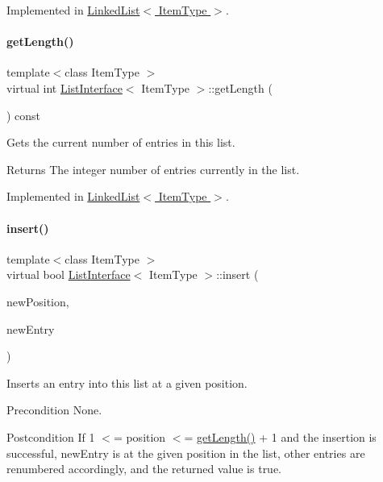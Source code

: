 Implemented in \hyperlink{class_linked_list_a341bfd7772c9d24d29eb7a7f3936915b}{Linked\+List$<$ Item\+Type $>$}.

\hypertarget{class_list_interface_afc85695d4137f1e29ff02e179c9f3221}{}\label{class_list_interface_afc85695d4137f1e29ff02e179c9f3221} 
\paragraph{\texorpdfstring{get\+Length()}{getLength()}}
{\footnotesize\ttfamily template$<$class Item\+Type $>$ \\
virtual int \hyperlink{class_list_interface}{List\+Interface}$<$ Item\+Type $>$\+::get\+Length (\begin{DoxyParamCaption}{ }\end{DoxyParamCaption}) const\hspace{0.3cm}{\ttfamily [pure virtual]}}

Gets the current number of entries in this list. \begin{DoxyReturn}{Returns}
The integer number of entries currently in the list. 
\end{DoxyReturn}


Implemented in \hyperlink{class_linked_list_a61d045ef6008b494a1a516ecc992c0e7}{Linked\+List$<$ Item\+Type $>$}.

\hypertarget{class_list_interface_a5b2f86954a86172699a3495982c38e77}{}\label{class_list_interface_a5b2f86954a86172699a3495982c38e77} 
\paragraph{\texorpdfstring{insert()}{insert()}}
{\footnotesize\ttfamily template$<$class Item\+Type $>$ \\
virtual bool \hyperlink{class_list_interface}{List\+Interface}$<$ Item\+Type $>$\+::insert (\begin{DoxyParamCaption}\item[{int}]{new\+Position,  }\item[{const Item\+Type \&}]{new\+Entry }\end{DoxyParamCaption})\hspace{0.3cm}{\ttfamily [pure virtual]}}

Inserts an entry into this list at a given position. \begin{DoxyPrecond}{Precondition}
None. 
\end{DoxyPrecond}
\begin{DoxyPostcond}{Postcondition}
If 1 $<$= position $<$= \hyperlink{class_list_interface_afc85695d4137f1e29ff02e179c9f3221}{get\+Length()} + 1 and the insertion is successful, new\+Entry is at the given position in the list, other entries are renumbered accordingly, and the returned value is true. 
\end{DoxyPostcond}

